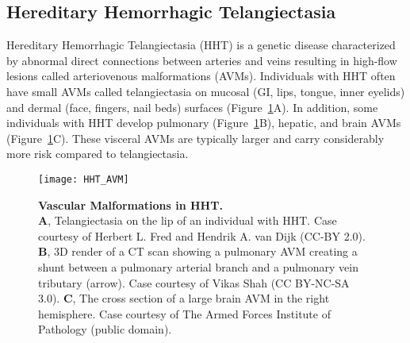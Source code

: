 \subsection{Hereditary Hemorrhagic Telangiectasia}
Hereditary Hemorrhagic Telangiectasia (HHT) is a genetic disease characterized by abnormal direct connections between arteries and veins resulting in high-flow lesions called arteriovenous malformations (AVMs). Individuals with HHT often have small AVMs called telangiectasia on mucosal (GI, lips, tongue, inner eyelids) and dermal (face, fingers, nail beds) surfaces (Figure~\ref{HHT_AVM}A). In addition, some individuals with HHT develop pulmonary (Figure~\ref{HHT_AVM}B), hepatic, and brain AVMs (Figure~\ref{HHT_AVM}C). These visceral AVMs are typically larger and carry considerably more risk compared to telangiectasia. 

\begin{figure}[bp!]
\begin{center}
\texttt{[image: HHT\_AVM]}
\end{center}
\caption[Vascular Malformations in HHT] {\textbf{Vascular Malformations in HHT.} \\ \textbf{A}, Telangiectasia on the lip of an individual with HHT. Case courtesy of Herbert L. Fred and Hendrik A. van Dijk (CC-BY 2.0). \textbf{B}, 3D render of a CT scan showing a pulmonary AVM creating a shunt between a pulmonary arterial branch and a pulmonary vein tributary (arrow). Case courtesy of Vikas Shah (CC BY-NC-SA 3.0). \textbf{C}, The cross section of a large brain AVM in the right hemisphere. Case courtesy of The Armed Forces Institute of Pathology (public domain).}

\label{HHT_AVM}
\end{figure}

